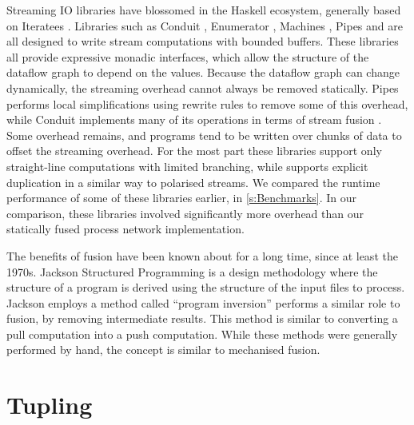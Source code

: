 
Streaming IO libraries have blossomed in the Haskell ecosystem, generally based on Iteratees \cite{kiselyov2012iteratees}.
Libraries such as Conduit \cite{hackage:conduit}, Enumerator \cite{hackage:enumerator}, Machines \cite{hackage:machines}, Pipes \cite{hackage:pipes} and \Streaming \cite{hackage:streaming} are all designed to write stream computations with bounded buffers.
These libraries all provide expressive monadic interfaces, which allow the structure of the dataflow graph to depend on the values.
Because the dataflow graph can change dynamically, the streaming overhead cannot always be removed statically.
Pipes performs local simplifications using rewrite rules to remove some of this overhead, while Conduit implements many of its operations in terms of stream fusion \citep{coutts2007stream}.
Some overhead remains, and programs tend to be written over chunks of data to offset the streaming overhead.
For the most part these libraries support only straight-line computations with limited branching, while \Streaming supports explicit duplication in a similar way to polarised streams.
We compared the runtime performance of some of these libraries earlier, in \cref{s:Benchmarks}.
In our comparison, these libraries involved significantly more overhead than our statically fused process network implementation.

The benefits of fusion have been known about for a long time, since at least the 1970s.
Jackson Structured Programming \citep{jackson1975principles,jackson2002jsp} is a design methodology where the structure of a program is derived using the structure of the input files to process.
Jackson employs a method called ``program inversion'' performs a similar role to fusion, by removing intermediate results.
This method is similar to converting a pull computation into a push computation.
While these methods were generally performed by hand, the concept is similar to mechanised fusion.

\section{Tupling}
\label{related/tupling}

